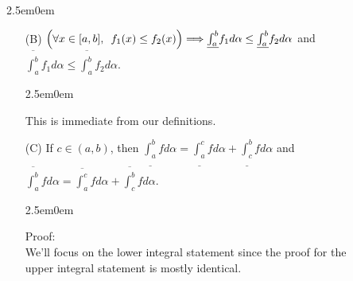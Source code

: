 \documentclass{book}
\newcommand{\hThree}{%
   \color{PineGreen!85!Orange}
   \fontsize{13}{15}\selectfont%
}
\newcommand{\hFour}{%
   \color{Cerulean}
   \fontsize{12}{14}\selectfont%
}
\newenvironment{myIndent}{%
   \begin{adjustwidth}{2.5em}{0em}%
}{%
   \end{adjustwidth}%
}
\newenvironment{myDindent}{%
   \begin{adjustwidth}{5em}{0em}%
}{%
   \end{adjustwidth}%
}
\newcommand{\myHS}{ \hspace{0.5em}}
\newcommand{\retTwo}{\hfill\bigbreak}
\begin{document}
{\begin{myIndent}
\begin{enumerate}
{\begin{myIndent}
\begin{myIndent}
\begin{itemize}
               \item when $c \leq 0$:
               
               \begin{tabular}{c c c}
                  $\circ\hspace{-1.2em}\inf\limits_{x_{i-1}\vphantom{\int^b} \leq x \leq x_i}\hspace{-1em}(cf(x)) = c\hspace{-1.0em}\sup\limits_{x_{i-1} \leq x \leq x_i}\hspace{-1em}f(x)$ & $\phantom{a}$ &

                  $\circ\hspace{-0.9em}\sup\limits_{x_{i-1} \leq x \leq x_i}\hspace{-1em}(cf(x)) = c\hspace{-1.1em}\inf\limits_{x_{i-1}\vphantom{\int^a} \leq x \leq x_i}\hspace{-1.2em}f(x)$\retTwo
               \end{tabular}
            \end{itemize}

            \begin{myDindent}\hFour
               This is another past homework question.
            \end{myDindent}
         \end{myIndent}
      \end{myIndent}}

      \newpage

      \item[(B)] {\fontsize{12}{14}\selectfont$\left(\vphantom{\int^b}\forall x \in [a, b], \myHS f_1(x) \leq f_2(x)\right) \Longrightarrow \underline{\int_a^b}f_1d\alpha \leq \underline{\int_a^b}f_2d\alpha$ and $\overline{\int_a^b}f_1d\alpha \leq \overline{\int_a^b}f_2d\alpha$}.\\ [-11pt]
      
      {\begin{myIndent}\hThree
         This is immediate from our definitions.
         \retTwo
      \end{myIndent}}

      \item[(C)] If $c \in (a, b)$, then {\fontsize{12}{14}\selectfont$\underline{\int_a^b}fd\alpha = \underline{\int_a^c}fd\alpha + \underline{\int_c^b}fd\alpha$ and $\overline{\int_a^b}fd\alpha = \overline{\int_a^c}fd\alpha + \overline{\int_c^b}fd\alpha$.}
      
      {\begin{myIndent}\hThree
         Proof:\\
         We'll focus on the lower integral statement since the proof for the\\ upper integral statement is mostly identical.\retTwo


\end{myIndent}}
\end{enumerate}
\end{myIndent}}
\end{document}
